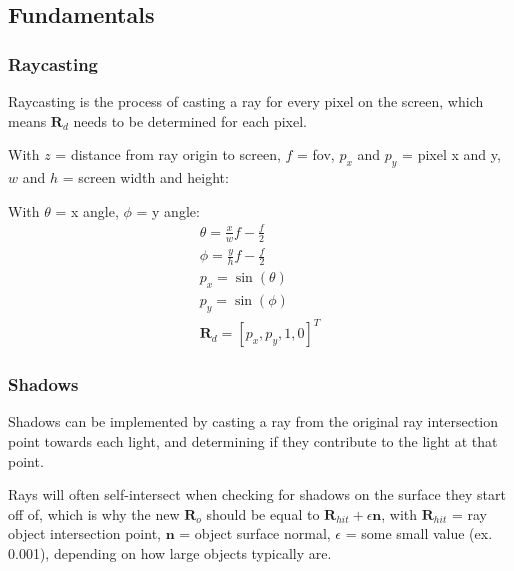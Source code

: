 \documentclass[12pt]{article}
\begin{document}
\subsection{Fundamentals}
\subsubsection{Raycasting}

Raycasting is the process of casting a ray for every pixel on the
screen, which means $\bm R_d$ needs to be determined for each pixel.

With $z$ = distance from ray origin to screen, $f$ = fov, $p_x$ and
$p_y$ = pixel x and y, $w$ and $h$ = screen width and height:


With $\theta$ = x angle, $\phi$ = y angle:
\begin{gather*}
    \theta = \frac{x}{w} f - \frac{f}{2}\\
    \phi = \frac{y}{h} f - \frac{f}{2}\\
    p_x = \sin(\theta)\\
    p_y = \sin(\phi)\\
    \bm R_d = [p_x,p_y,1,0]^T
\end{gather*}

\subsubsection{Shadows}

Shadows can be implemented by casting a ray from the original ray
intersection point towards each light, and determining if they contribute
to the light at that point.

Rays will often self-intersect when checking for shadows on the surface
they start off of, which is why the new $\bm R_o$ should be equal
to $\bm R_{hit} + \epsilon \bm n$, with $\bm R_{hit}$ = ray object
intersection point, $\bm n$ = object surface normal, $\epsilon$ =
some small value (ex. 0.001), depending on how large objects typically
are.
\end{document}
